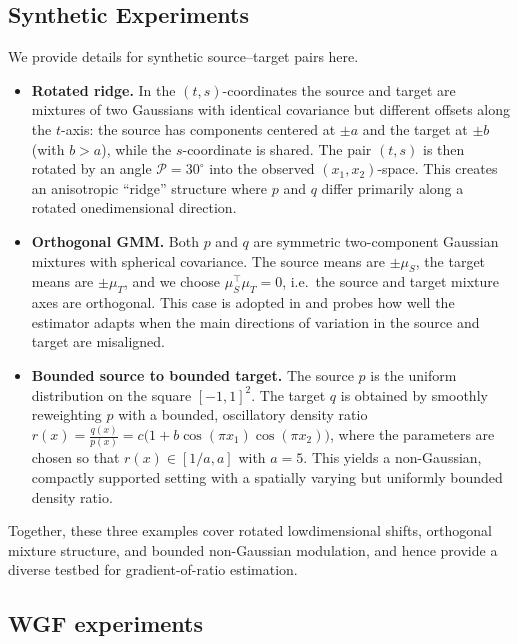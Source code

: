 \documentclass[11pt]{article}
\theoremstyle{plain}
\theoremstyle{definition}
\theoremstyle{remark}
\begin{document}
\subsection{Synthetic Experiments}
We provide details for synthetic source--target pairs here.
\label{subsec:Synthetic source--target pairs}
\begin{itemize}
  \item \textbf{Rotated ridge.}
  In the \((t,s)\)-coordinates the source and target are mixtures of
  two Gaussians with identical covariance but different offsets along
  the \(t\)-axis:
  the source has components centered at \(\pm a\) and the target at
  \(\pm b\) (with \(b>a\)), while the \(s\)-coordinate is shared.
  The pair \((t,s)\) is then rotated by an angle \(\mathcal{P}=30^\circ\)
  into the observed \((x_1,x_2)\)-space.
  This creates an anisotropic ``ridge'' structure where \(p\) and \(q\)
  differ primarily along a rotated onedimensional direction.

  \item \textbf{Orthogonal GMM.}
  Both \(p\) and \(q\) are symmetric two-component Gaussian mixtures
  with spherical covariance.
  The source means are \(\pm \mu_S\), the target means are
  \(\pm \mu_T\), and we choose \(\mu_S^\top \mu_T = 0\),
  i.e.\ the source and target mixture axes are orthogonal.
  This case is adopted in \citet{ouyang2024transfer} and probes how well the estimator adapts when the main
  directions of variation in the source and target are misaligned.

  \item \textbf{Bounded source to bounded target.}
  The source \(p\) is the uniform distribution on the square
  \([-1,1]^2\).
  The target \(q\) is obtained by smoothly reweighting \(p\) with a
  bounded, oscillatory density ratio
  \(r(x) = \tfrac{q(x)}{p(x)}
      = c \bigl(1 + b \cos(\pi x_1)\cos(\pi x_2)\bigr)\),
  where the parameters are chosen so that \(r(x)\in[1/a,a]\) with
  \(a=5\).
  This yields a non-Gaussian, compactly supported setting with a
  spatially varying but uniformly bounded density ratio.
\end{itemize}
Together, these three examples cover rotated lowdimensional shifts,
orthogonal mixture structure, and bounded non-Gaussian modulation,
and hence provide a diverse testbed for gradient-of-ratio estimation.
\subsection{WGF experiments}
\end{document}
